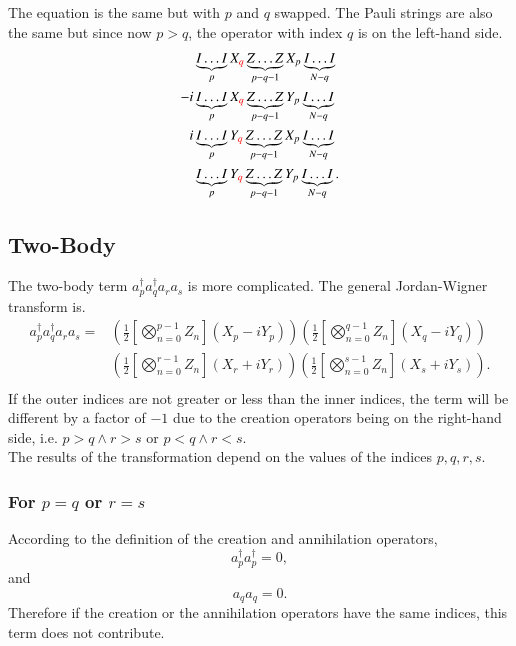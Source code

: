 The equation is the same but with $ p $ and $ q $ swapped. The Pauli strings are also the same but since now $ p > q $, the operator with index $ q $ is on the left-hand side. 
\begin{align}
	\label{eq:p_greaterthan_q}
	&\underbrace{I\ldots I}_{p}X_{{\color{red}q}} \underbrace{Z\ldots Z}_{p-q-1}X_p \underbrace{I\ldots I}_{N-q} \\
	-i &\underbrace{I\ldots I}_{p}X_{{\color{red} q}} \underbrace{Z\ldots Z}_{p-q-1}Y_p \underbrace{I\ldots I}_{N-q} \\
	i &\underbrace{I\ldots I}_{p}Y_{{\color{red} q}} \underbrace{Z\ldots Z}_{p-q-1}X_p \underbrace{I\ldots I}_{N-q} \\
	  &\underbrace{I\ldots I}_{p}Y_{{\color{red} q}} \underbrace{Z\ldots Z}_{p-q-1}Y_p \underbrace{I\ldots I}_{N-q}.
\end{align}

\subsection{Two-Body}
\label{sub:two-body}
The two-body term $ a_{p}^{\dagger}a_{q}^{\dagger}a_ra_s $ is more complicated. The general Jordan-Wigner transform is.
\begin{equation}
	\label{eq:tb_jw}
	\begin{aligned}
		a_{p}^{\dagger}a_{q}^{\dagger}a_ra_s = 
		& \left( \frac{1}{2} \left[ \bigotimes_{n=0}^{p-1} Z_n \right] \left( X_p - i Y_p \right)   \right) 
		\left( \frac{1}{2} \left[ \bigotimes_{n=0}^{q-1} Z_n \right] \left( X_q - i Y_q \right)   \right) \\
		& \left( \frac{1}{2} \left[ \bigotimes_{n=0}^{r-1} Z_n \right] \left( X_r + i Y_r \right)   \right) 
	 \left( \frac{1}{2} \left[ \bigotimes_{n=0}^{s-1} Z_n \right] \left( X_s +i Y_s \right)   \right).\\
	\end{aligned}
\end{equation}
If the outer indices are not greater or less than the inner indices, the term will be different by a factor of $ -1 $ due to the creation operators being on the right-hand side, i.e. $ p > q \wedge r > s $ or $ p < q \wedge r < s$. \\
The results of the transformation depend on the values of the indices $ p,q,r,s $.

\subsubsection{For $p=q$ or $r=s$}%
\label{ssub:p_equals_q_or_r_equals_s}
According to the definition of the creation and annihilation operators, \[a_{p}^{\dagger}a_{p}^{\dagger} = 0, \] and \[ a_qa_q = 0.\] Therefore if the creation or the annihilation operators have the same indices, this term does not contribute.


